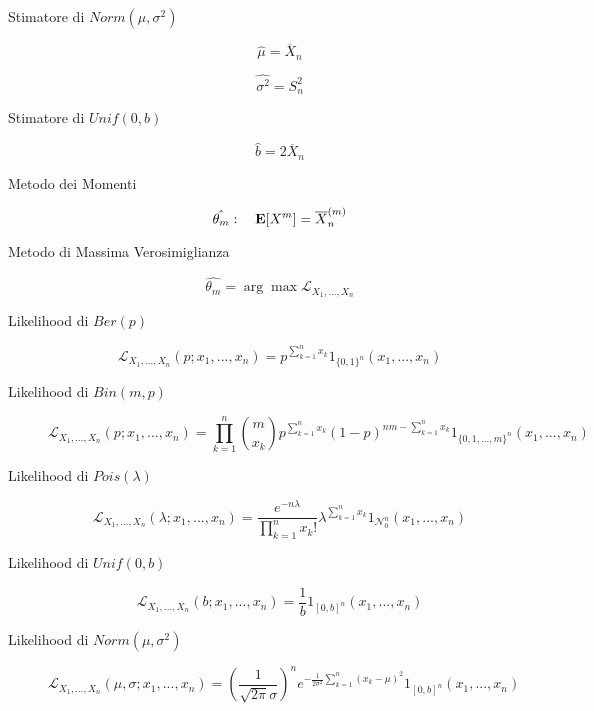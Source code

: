 \begin{description}
	\item[Stimatore di $Norm(\mu,\sigma^{2})$]
		\begin{equation}
		\hat{\mu} = \overline{X}_{n}
		\end{equation}
		
		\begin{equation}
		\hat{\sigma^{2}} = S_{n}^{2}
		\end{equation}
	
	\item[Stimatore di $Unif(0,b)$]
		\begin{equation}
		\hat{b} = 2\overline{X}_{n}
		\end{equation}
	
	\item[Metodo dei Momenti]
		\begin{equation}
		\hat{\theta_{m}}:\quad \mathbf{E}[X^{m}]=\overline{X}_{n}^{(m)} 
		\end{equation}
	
	\item[Metodo di Massima Verosimiglianza]
		\begin{equation}
		\hat{\theta_{m}} = \arg\max\mathcal{L}_{X_{1},...,X_{n}}
		\end{equation}
	
	\item[Likelihood di $Ber(p)$]
		\begin{equation}
		\mathcal{L}_{X_{1},...,X_{n}}(p;x_{1},...,x_{n})=
		p^{\sum_{k=1}^{n}x_{k}}
		\mathfrak{1}_{\{0,1\}^{n}}(x_{1},...,x_{n})
		\end{equation}
	
	\item[Likelihood di $Bin(m,p)$]
		\begin{equation}
		\mathcal{L}_{X_{1},...,X_{n}}(p;x_{1},...,x_{n})=
		\prod_{k=1}^{n}\binom{m}{x_{k}} p^{\sum_{k=1}^{n}x_{k}}(1-p)^{nm-\sum_{k=1}^{n}x_{k}}
		\mathfrak{1}_{\{0,1,...,m\}^{n}}(x_{1},...,x_{n})
		\end{equation}
	
	\item[Likelihood di $Pois(\lambda)$]
		\begin{equation}
		\mathcal{L}_{X_{1},...,X_{n}}(\lambda;x_{1},...,x_{n})=
		\frac{e^{-n\lambda}}{\prod_{k=1}^{n}x_{k}!}\lambda^{\sum_{k=1}^{n}x_{k}}
		\mathfrak{1}_{\mathcal{N}_{0}^{n}}(x_{1},...,x_{n})
		\end{equation}
	
	\item[Likelihood di $Unif(0,b)$]
		\begin{equation}
		\mathcal{L}_{X_{1},...,X_{n}}(b;x_{1},...,x_{n})=
		\frac{1}{b}
		\mathfrak{1}_{[0,b]^{n}}(x_{1},...,x_{n})
		\end{equation}
	
	\item[Likelihood di $Norm(\mu,\sigma^{2})$]
		\begin{equation}
		\mathcal{L}_{X_{1},...,X_{n}}(\mu,\sigma;x_{1},...,x_{n})=
		(\frac{1}{\sqrt{2\pi}\sigma})^{n}e^{-\frac{1}{2\sigma^{2}}\sum_{k=1}^{n}(x_{k}-\mu)^{2}}
		\mathfrak{1}_{[0,b]^{n}}(x_{1},...,x_{n})
		\end{equation}
\end{description}
\newpage

